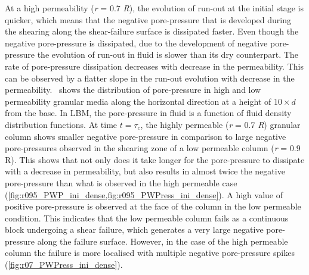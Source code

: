 \documentclass[12pt,a4paper,twocolumn,fleqn]{narms}
\begin{document}
At a high permeability (\textit{r} = 0.7 \textit{R}), the evolution of run-out 
at the initial stage is quicker, which means that the negative pore-pressure 
that is developed during the shearing along the shear-failure surface is 
dissipated faster. Even though the negative pore-pressure is dissipated, due to 
the development of negative pore-pressure the evolution of run-out in fluid is 
slower than its dry counterpart. The rate of pore-pressure dissipation 
decreases with decrease in the permeability. This can be observed by a flatter 
slope in the run-out evolution with decrease in the 
permeability.~ shows the distribution of pore-pressure 
in high and low permeability granular media along the horizontal direction at a 
height of $10 \times d$ from the base. In LBM, the pore-pressure in fluid is a 
function of fluid density distribution functions. At time $t = \tau_c$, the 
highly permeable (\textit{r} = 0.7 \textit{R}) granular column 
shows smaller negative pore-pressure in comparison to large negative 
pore-pressures observed in the shearing zone of a low permeable column 
(\textit{r} = 0.9 R). This shows that not only does it take longer for the 
pore-pressure to dissipate with a decrease in permeability, but also results in 
almost twice the negative pore-pressure than what is observed in the high 
permeable case (\cref{fig:r095_PWP_ini_dense,fig:r095_PWPress_ini_dense}). A 
high value of positive pore-pressure is observed at the face of the column 
in the low permeable condition. This indicates that the low permeable column 
fails as a continuous block undergoing a shear failure, which generates a very 
large negative pore-pressure along the failure surface. However, in the case of 
the high permeable column the failure is more localised with multiple negative 
pore-pressure spikes (\cref{fig:r07_PWPress_ini_dense}).
\end{document}
